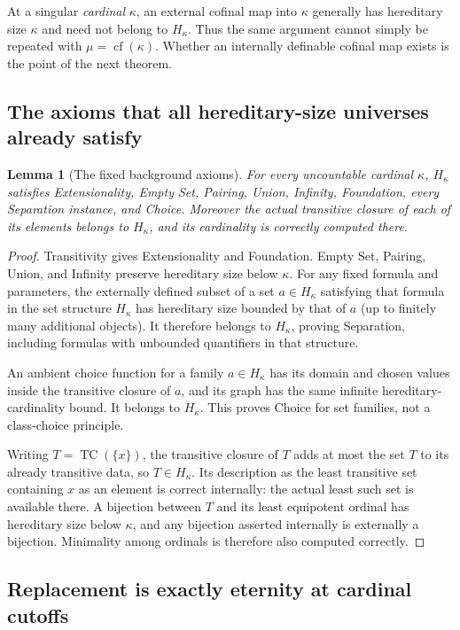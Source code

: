 \documentclass[11pt,letterpaper]{article}
\newtheorem{lemma}[lemma]{Lemma}\aliascntresetthe{lemma}
\theoremstyle{definition}
\theoremstyle{remark}
\newcommand{\TC}{\operatorname{TC}}
\newcommand{\cf}{\operatorname{cf}}
\begin{document}
At a singular \emph{cardinal} $\kappa$, an external cofinal map into
$\kappa$ generally has hereditary size $\kappa$ and need not belong to
$H_\kappa$. Thus the same argument cannot simply be repeated with
$\mu=\cf(\kappa)$. Whether an internally definable cofinal map exists is the
point of the next theorem.

\subsection{The axioms that all hereditary-size universes already satisfy}

\begin{lemma}[The fixed background axioms]
\label{hset:lem:H-background}
For every uncountable cardinal $\kappa$, $H_\kappa$ satisfies
Extensionality, Empty Set, Pairing, Union, Infinity, Foundation, every
Separation instance, and Choice. Moreover the actual transitive closure of
each of its elements belongs to $H_\kappa$, and its cardinality is correctly
computed there.
\end{lemma}
\begin{proof}
Transitivity gives Extensionality and Foundation. Empty Set, Pairing, Union,
and Infinity preserve hereditary size below $\kappa$. For any fixed formula
and parameters, the externally defined subset of a set $a\in H_\kappa$
satisfying that formula in the set structure $H_\kappa$ has hereditary size
bounded by that of $a$ (up to finitely many additional objects). It therefore
belongs to $H_\kappa$, proving Separation, including formulas with unbounded
quantifiers in that structure.

An ambient choice function for a family $a\in H_\kappa$ has its domain and
chosen values inside the transitive closure of $a$, and its graph has the
same infinite hereditary-cardinality bound. It belongs to $H_\kappa$.
This proves Choice for set families, not a class-choice principle.

Writing $T=\TC(\{x\})$, the transitive closure of $T$ adds at most the set
$T$ to its already transitive data, so $T\in H_\kappa$. Its description as
the least transitive set containing $x$ as an element is correct internally:
the actual least such set is available there. A bijection between $T$ and
its least equipotent ordinal has hereditary size below $\kappa$, and any
bijection asserted internally is externally a bijection. Minimality among
ordinals is therefore also computed correctly.
\end{proof}

\subsection{Replacement is exactly eternity at cardinal cutoffs}
\end{document}
